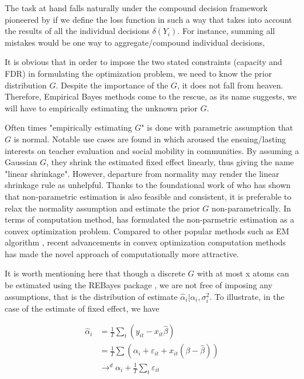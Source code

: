 \documentclass[12pt]{article}
\begin{document}
The task at hand falls naturally under the compound decision framework
pioneered by \cite{} if we define the loss function in such a way that takes
into account the results of all the individual decisions $\delta(Y_i)$. For
instance, summing all mistakes would be one way to aggregate/compound
individual decisions,

It is obvious that in order to impose the two stated constraints (capacity and
FDR) in formulating the optimization problem, we need to know the prior
distribution $G$. Despite the importance of the $G$, it does not fall from
heaven. Therefore, Empirical Bayes methods come to the rescue, as its name
suggests, we will have to empirically estimating the unknown prior $G$.

Often times "empirically estimating \(G\)" is done with parametric assumption
that \(G\) is normal. Notable use cases are found in \cite{} which aroused the
ensuing/lasting interests on teacher evaluation and social mobility in
communities. By assuming a Gaussian $G$, they shrink the estimated fixed effect
linearly, thus giving the name "linear shrinkage". However, departure from
normality may render the linear shrinkage rule as unhelpful. Thanks to the
foundational work of \cite{} who has shown that non-parametric estimation is
also feasible and consistent, it is preferable to relax the normality
assumption and estimate the prior $G$ non-parametrically. In terms of
computation method, \cite{} has formulated the non-parmetric estimation as a
convex optimization problem. Compared to other popular methods such as EM
algorithm \cite{}, recent advancements in convex optimization computation
methods \cite{} has made the novel approach of \cite{} computationally more
attractive.

It is worth mentioning here that though a discrete $G$ with at most x atoms can
be estimated using the REBayes package \cite{}, we are not free of imposing any
assumptions, that is the distribution of estimate
$\hat{\alpha}_i|\alpha_i,\sigma_i^2.$ To illustrate, in the case of the
estimate of fixed effect, we have

\begin{align*}
    \hat{\alpha}_i & =\frac{1}{T}\sum_t (y_{it}-x_{it}\hat{\beta})                         \\
                   & =\frac{1}{T}\sum(\alpha_i+\varepsilon_{it}+x_{it}(\beta-\hat{\beta})) \\
                   & \to^d \alpha_i+\frac{1}{T}\sum_t \varepsilon_{it}                     \\
\end{align*}
\end{document}

